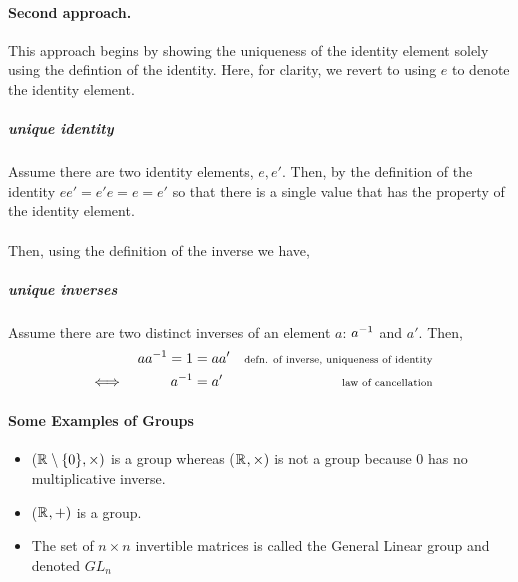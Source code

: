 \documentclass[MathsNotesBase.tex]{subfiles}
\begin{document}
{		\paragraph*{Second approach.} This approach begins by showing the uniqueness of the identity element solely using the defintion of the identity. Here, for clarity, we revert to using $e$ to denote the identity element.
		\subparagraph*{unique identity} Assume there are two identity elements, $e, e'$. Then, by the definition of the identity $ee' = e'e = e = e'$ so that there is a single value that has the property of the identity element.\\\\
		Then, using the definition of the inverse we have,
		\subparagraph{unique inverses} Assume there are two distinct inverses of an element $a$: ${a}^{-1}$ and $a'$. Then, 
		\begin{align*}
		&& a{a}^{-1} = 1 &= aa' &\text{\scriptsize{defn. of inverse, uniqueness of identity}}\\
		& \iff & {a}^{-1} &= a' &\text{\scriptsize{law of cancellation}}
		\end{align*}
		\bigskip\bigskip

		\paragraph*{Some Examples of Groups}
		\begin{itemize}
		\item{ ($\mathbb{R}^{} \setminus \{0\}, \times)$ } is a group whereas ($\mathbb{R}^{}, \times)$ is not a group because $0$ has no multiplicative inverse.
		\item{ ($\mathbb{R}^{}, +)$ } is a group.
		\item{ The set of $n \times n$ invertible matrices is called the General Linear group and denoted $GL_n$  }
		\end{itemize}
}
\end{document}
